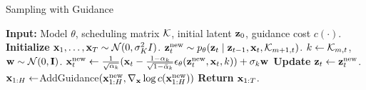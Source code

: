\begin{algorithm}[H]
\footnotesize
\caption{\algshort{} Sampling with Guidance}
\label{alg:diffusion_forcing_sampling}
\begin{algorithmic}[1]
\STATE \textbf{Input:} Model  $\theta$, scheduling matrix $\mathcal{K}$, initial latent $\mathbf{z}_0$, guidance cost $c(\cdot)$.
\STATE \textbf{Initialize} $\mathbf{x}_1,\dots,\mathbf{x}_T \sim \mathcal{N}(0,\sigma_K^2 I)$. 
        \STATE $\mathbf{z}_t^{\mathrm{new}} \sim p_{\theta}(\mathbf{z}_t \mid \mathbf{z}_{t-1}, \mathbf{x}_t,\mathcal{K}_{m+1,t})$.  \label{line:latent_infernece}
        \STATE $k \gets \mathcal{K}_{m,t}$, $\mathbf{w} \sim \mathcal{N}(0,\mathbf{I})$.
        \STATE $ \mathbf{x}_t^{\mathrm{new}} \gets \frac{1}{\sqrt{\alpha_k}}(\mathbf{x}_t - \frac{1-\alpha_k}{\sqrt{1-\bar{\alpha}_k}}\epsilon_{\theta}(\mathbf{z}_t^{\mathrm{new}},\mathbf{x}_t,k)) + \sigma_k \mathbf{w}$ 
        \label{alg:line_backward}
        \STATE \textbf{Update} $\mathbf{z}_t \gets \mathbf{z}_t^{\mathrm{new}}$.
    \ENDFOR
    \STATE
    $\mathbf{x}_{1:H} \leftarrow$AddGuidance$(\mathbf{x}_{1:H}^{\mathrm{new}}, \nabla_{\mathbf{x}}\log c({\mathbf{x}}_{1:H}^{\mathrm{new}} ))$
    \ENDFOR
    \STATE \textbf{Return} $\mathbf{x}_{1:T}$.
    \vspace{1.5pt}
\end{algorithmic}
\end{algorithm}
